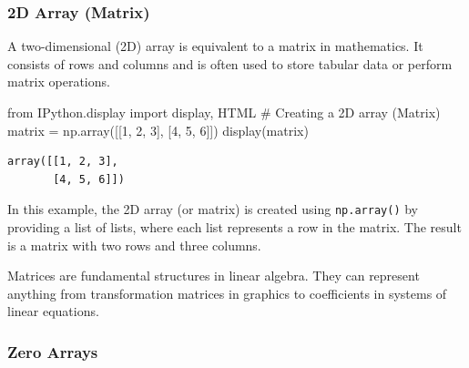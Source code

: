 \documentclass[
  letterpaper,
  DIV=11,
  numbers=noendperiod]{scrreprt}
\newenvironment{Shaded}{\begin{snugshade}}{\end{snugshade}}
\newcommand{\CommentTok}[1]{\textcolor[rgb]{0.37,0.37,0.37}{#1}}
\newcommand{\DecValTok}[1]{\textcolor[rgb]{0.68,0.00,0.00}{#1}}
\newcommand{\ImportTok}[1]{\textcolor[rgb]{0.00,0.46,0.62}{#1}}
\newcommand{\NormalTok}[1]{\textcolor[rgb]{0.00,0.23,0.31}{#1}}
\newcommand{\OperatorTok}[1]{\textcolor[rgb]{0.37,0.37,0.37}{#1}}
\theoremstyle{plain}
\theoremstyle{definition}
\theoremstyle{remark}
\begin{document}
\subsubsection{2D Array (Matrix)}\label{d-array-matrix}

A two-dimensional (2D) array is equivalent to a matrix in mathematics.
It consists of rows and columns and is often used to store tabular data
or perform matrix operations.

\begin{Shaded}
\begin{Highlighting}[]
\ImportTok{from}\NormalTok{ IPython.display }\ImportTok{import}\NormalTok{ display, HTML}
\CommentTok{\# Creating a 2D array (Matrix)}
\NormalTok{matrix }\OperatorTok{=}\NormalTok{ np.array([[}\DecValTok{1}\NormalTok{, }\DecValTok{2}\NormalTok{, }\DecValTok{3}\NormalTok{], [}\DecValTok{4}\NormalTok{, }\DecValTok{5}\NormalTok{, }\DecValTok{6}\NormalTok{]])}
\NormalTok{display(matrix)}
\end{Highlighting}
\end{Shaded}

\begin{verbatim}
array([[1, 2, 3],
       [4, 5, 6]])
\end{verbatim}

In this example, the 2D array (or matrix) is created using
\texttt{np.array()} by providing a list of lists, where each list
represents a row in the matrix. The result is a matrix with two rows and
three columns.

\begin{tcolorbox}[enhanced jigsaw, leftrule=.75mm, bottomtitle=1mm, colback=white, toptitle=1mm, opacitybacktitle=0.6, toprule=.15mm, colbacktitle=quarto-callout-note-color!10!white, arc=.35mm, colframe=quarto-callout-note-color-frame, title=\textcolor{quarto-callout-note-color}{\faInfo}\hspace{0.5em}{Use:}, titlerule=0mm, rightrule=.15mm, left=2mm, bottomrule=.15mm, breakable, coltitle=black, opacityback=0]

Matrices are fundamental structures in linear algebra. They can
represent anything from transformation matrices in graphics to
coefficients in systems of linear equations.

\end{tcolorbox}

\subsubsection{Zero Arrays}\label{zero-arrays}
\end{document}
